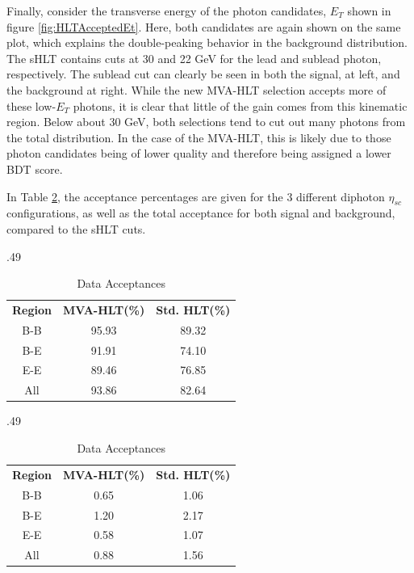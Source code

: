 \documentclass[12pt]{ucsddissertation}
\begin{document}
Finally, consider the transverse energy of the photon candidates, $E_T$ shown in figure \ref{fig:HLTAcceptedEt}. Here, both candidates are again shown on the same plot, which explains the double-peaking behavior in the background distribution. The sHLT contains cuts at 30 and 22 GeV for the lead and sublead photon, respectively. The sublead cut can clearly be seen in both the signal, at left, and the background at right. While the new MVA-HLT selection accepts more of these low-$E_T$ photons, it is clear that little of the gain comes from this kinematic region. Below about 30 GeV, both selections tend to cut out many photons from the total distribution. In the case of the MVA-HLT, this is likely due to those photon candidates being of lower quality and therefore being assigned a lower BDT score.

In Table \ref{tab:HLTEffs}, the acceptance percentages are given for the 3 different diphoton $\eta_{sc}$ 
configurations, as well as the total acceptance for both signal and background, compared to the sHLT cuts.

\begin{table}[h]
    \centering
    \caption{Signal efficiencies and background acceptances for both triggers, broken down by diphoton $\eta_{sc}$}
	\label{tab:HLTEffs}
    \begin{subtable}{.49\textwidth}
        \centering
        \caption{Signal Efficiencies}
        \begin{tabular}{|c|c|c|}
            \hline
            \textbf{Region} & \textbf{MVA-HLT(\%)} & \textbf{Std. HLT(\%)}\\
			\Xhline{2pt}
            B-B & 95.93 & 89.32\\ \hline
            B-E & 91.91 & 74.10\\ \hline
            E-E & 89.46 & 76.85\\ \hline
            All & 93.86 & 82.64\\ \hline
        \end{tabular}
    \end{subtable}
    \hfill
	\begin{subtable}{.49\textwidth}
        \centering
        \caption{Data Acceptances}
        \begin{tabular}{|c|c|c|}
            \hline
            \textbf{Region} & \textbf{MVA-HLT(\%)} & \textbf{Std. HLT(\%)}\\
			\Xhline{2pt}
            B-B & 0.65 & 1.06\\ \hline
            B-E & 1.20 & 2.17\\ \hline
            E-E & 0.58 & 1.07\\ \hline
            All & 0.88 & 1.56\\ \hline
        \end{tabular}
    \end{subtable}
\end{table}
\end{document}
